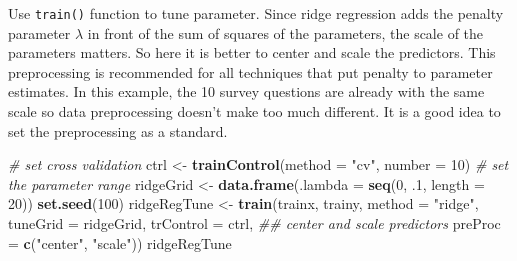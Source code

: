 \documentclass[12pt,]{krantz}
\makeatletter
\newenvironment{Shaded}{\begin{snugshade}}{\end{snugshade}}
\newcommand{\CommentTok}[1]{\textcolor[rgb]{0.37,0.37,0.37}{\textit{#1}}}
\newcommand{\DataTypeTok}[1]{\textcolor[rgb]{0.27,0.27,0.27}{#1}}
\newcommand{\DecValTok}[1]{\textcolor[rgb]{0.06,0.06,0.06}{#1}}
\newcommand{\FloatTok}[1]{\textcolor[rgb]{0.06,0.06,0.06}{#1}}
\newcommand{\KeywordTok}[1]{\textcolor[rgb]{0.27,0.27,0.27}{\textbf{#1}}}
\newcommand{\NormalTok}[1]{#1}
\newcommand{\OperatorTok}[1]{\textcolor[rgb]{0.43,0.43,0.43}{\textbf{#1}}}
\newcommand{\StringTok}[1]{\textcolor[rgb]{0.5,0.5,0.5}{#1}}
\newenvironment{kframe}{%
\medskip{}
\setlength{\fboxsep}{.8em}
 \def\at@end@of@kframe{}%
 \ifinner\ifhmode%
  \def\at@end@of@kframe{\end{minipage}}%
  \begin{minipage}{\columnwidth}%
 \fi\fi%
 \def\FrameCommand##1{\hskip\@totalleftmargin \hskip-\fboxsep
 \colorbox{shadecolor}{##1}\hskip-\fboxsep
     \hskip-\linewidth \hskip-\@totalleftmargin \hskip\columnwidth}%
 \MakeFramed {\advance\hsize-\width
   \@totalleftmargin\z@ \linewidth\hsize
   \@setminipage}}%
 {\par\unskip\endMakeFramed%
 \at@end@of@kframe}
\renewenvironment{Shaded}{\begin{kframe}}{\end{kframe}}
\makeatother
\begin{document}
\begin{Shaded}
\end{Shaded}

Use \texttt{train()} function to tune parameter. Since ridge regression adds the penalty parameter \(\lambda\) in front of the sum of squares of the parameters, the scale of the parameters matters. So here it is better to center and scale the predictors. This preprocessing is recommended for all techniques that put penalty to parameter estimates. In this example, the 10 survey questions are already with the same scale so data preprocessing doesn't make too much different. It is a good idea to set the preprocessing as a standard.

\begin{Shaded}
\begin{Highlighting}[]
\CommentTok{# set cross validation}
\NormalTok{ctrl <-}\StringTok{ }\KeywordTok{trainControl}\NormalTok{(}\DataTypeTok{method =} \StringTok{"cv"}\NormalTok{, }\DataTypeTok{number =} \DecValTok{10}\NormalTok{)}
\CommentTok{# set the parameter range }
\NormalTok{ridgeGrid <-}\StringTok{ }\KeywordTok{data.frame}\NormalTok{(}\DataTypeTok{.lambda =} \KeywordTok{seq}\NormalTok{(}\DecValTok{0}\NormalTok{, }\FloatTok{.1}\NormalTok{, }\DataTypeTok{length =} \DecValTok{20}\NormalTok{))}
\KeywordTok{set.seed}\NormalTok{(}\DecValTok{100}\NormalTok{)}
\NormalTok{ridgeRegTune <-}\StringTok{ }\KeywordTok{train}\NormalTok{(trainx, trainy,}
                      \DataTypeTok{method =} \StringTok{"ridge"}\NormalTok{,}
                      \DataTypeTok{tuneGrid =}\NormalTok{ ridgeGrid,}
                      \DataTypeTok{trControl =}\NormalTok{ ctrl,}
                      \CommentTok{## center and scale predictors}
                      \DataTypeTok{preProc =} \KeywordTok{c}\NormalTok{(}\StringTok{"center"}\NormalTok{, }\StringTok{"scale"}\NormalTok{))}
\NormalTok{ridgeRegTune}
\end{Highlighting}
\end{Shaded}
\end{document}
